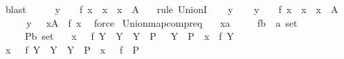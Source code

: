 \begin{isabellebody}
\ blast\isanewline
\ \ \isamarkupfalse%
\ \isamarkupfalse%
\ {\isachardoublequoteopen}y\ {\isasymin}\ {\isasymUnion}\ {\isacharbraceleft}\ f\ x\ {\isacharbar}\ x\ {\isachardot}\ x\ {\isasymin}\ A\ {\isacharbraceright}{\isachardoublequoteclose}\ \isamarkupfalse%
\ {\isacharparenleft}rule\ UnionI{\isacharparenright}\isanewline
{}\isamarkupfalse%
\isanewline
\ \ \isamarkupfalse%
\ y\isanewline
\ \ \isamarkupfalse%
\ {\isachardoublequoteopen}y\ {\isasymin}\ {\isasymUnion}\ {\isacharbraceleft}\ f\ x\ {\isacharbar}\ x\ {\isachardot}\ x\ {\isasymin}\ A\ {\isacharbraceright}{\isachardoublequoteclose}\isanewline
\ \ \isamarkupfalse%
\ \isamarkupfalse%
\ {\isachardoublequoteopen}y\ {\isasymin}\ {\isacharparenleft}{\isasymUnion}\ x{\isasymin}A\ {\isachardot}\ f\ x{\isacharparenright}{\isachardoublequoteclose}\ \isamarkupfalse%
\ force\isanewline
{}\isamarkupfalse%
%
\endisatagproof
{\isafoldproof}%
%
\isadelimproof
\isanewline
%
\endisadelimproof
\isanewline
\isanewline
{}\isamarkupfalse%
\ Union{\isacharunderscore}map{\isacharunderscore}compr{\isacharunderscore}eq{}{\isacharcolon}\isanewline
\ \ \ x{\isacharcolon}{\isacharcolon}{\isacharprime}a\isanewline
\ \ \ \ \ f{\isacharcolon}{\isacharcolon}{\isachardoublequoteopen}{\isacharprime}b\ {\isasymRightarrow}\ {\isacharprime}a\ set{\isachardoublequoteclose}\isanewline
\ \ \ \ \ P{\isacharcolon}{\isacharcolon}{\isachardoublequoteopen}{\isacharprime}b\ set{\isachardoublequoteclose}\isanewline
\ \ \ {\isachardoublequoteopen}x\ {\isasymin}\ {\isacharparenleft}{\isasymUnion}\ {\isacharbraceleft}f\ Y\ {\isacharbar}\ Y\ {\isachardot}\ Y\ {\isasymin}\ P{\isacharbraceright}{\isacharparenright}\ {\isasymlongleftrightarrow}\ {\isacharparenleft}{\isasymexists}\ Y\ {\isasymin}\ P\ {\isachardot}\ x\ {\isasymin}\ f\ Y{\isacharparenright}{\isachardoublequoteclose}\isanewline
%
\isadelimproof
\isanewline
%
\endisadelimproof
%
\isatagproof
{}\isamarkupfalse%
\ {\isacharminus}\isanewline
\ \ \isamarkupfalse%
\ {\isachardoublequoteopen}x\ {\isasymin}\ {\isacharparenleft}{\isasymUnion}\ {\isacharbraceleft}f\ Y\ {\isacharbar}\ Y\ {\isachardot}\ Y\ {\isasymin}\ P{\isacharbraceright}{\isacharparenright}\ {\isasymlongleftrightarrow}\ x\ {\isasymin}\ {\isacharparenleft}{\isasymUnion}\ {\isacharparenleft}f\ {\isacharbackquote}\ P{\isacharparenright}{\isacharparenright}{\isachardoublequoteclose}\ \isamarkupfalse%

\end{isabellebody}
